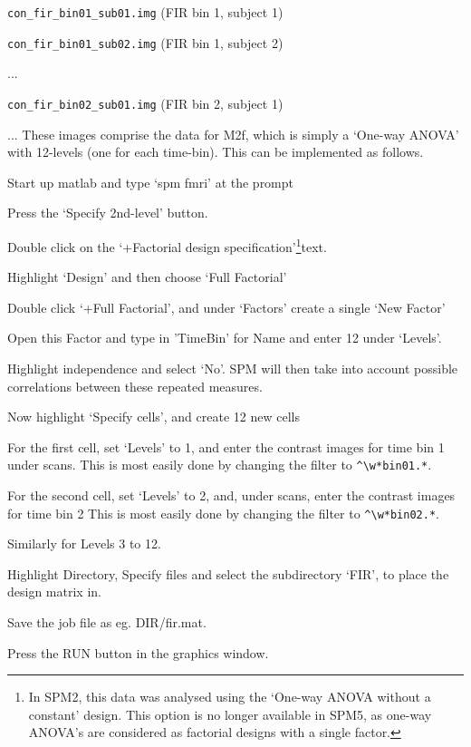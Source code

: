 \bi
\item{\verb!con_fir_bin01_sub01.img!	(FIR bin 1, subject 1)}
\item{\verb!con_fir_bin01_sub02.img!	(FIR bin 1, subject 2)}
\item{...}
\item{\verb!con_fir_bin02_sub01.img!	(FIR bin 2, subject 1)}
\item{...}
\ei
These images comprise the data for M2f, which is simply a `One-way ANOVA' with 12-levels (one for each time-bin). This can be implemented as follows.
\bi
\item{Start up matlab and type `spm fmri' at the prompt}
\item{Press the `Specify 2nd-level' button.}
\item{Double click on the `+Factorial design specification'\footnote{In SPM2, this data was analysed using the `One-way ANOVA without a constant' design. This option is no longer available in SPM5, as one-way ANOVA's are considered as factorial designs with a single factor.}text.}
\item{Highlight `Design' and then choose `Full Factorial'}
\item{Double click `+Full Factorial', and under `Factors' create a single `New Factor'}
\item{Open this Factor and type in 'TimeBin' for Name and enter 12 under `Levels'.}
\item{Highlight independence and select `No'. SPM will then take into account possible correlations between these repeated measures.}
\item{Now highlight `Specify cells', and create 12 new cells}  
\item{For the first cell, set `Levels' to 1, and enter the contrast images for time bin 1 under scans. This is most easily done by changing the filter to \verb!^\w*bin01.*!.}    
\item{For the second cell, set `Levels' to 2, and, under scans, enter the 
contrast images for time bin 2 This is most easily done by changing the filter to \verb!^\w*bin02.*!.}   
\item{Similarly for Levels 3 to 12.}               
\item{Highlight Directory, Specify files and select the 
subdirectory `FIR', to place the design matrix in.}
\item{Save the job file as eg. {\sf DIR/fir.mat}}.
\item{Press the RUN button in the graphics window.}
\ei


